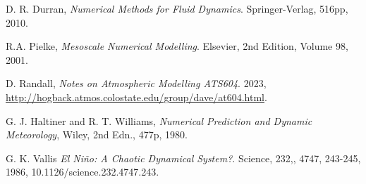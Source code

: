 D. R. Durran,
\emph{Numerical Methods for Fluid Dynamics}.
Springer-Verlag,
516pp,
2010.

R.A. Pielke,
\emph{Mesoscale Numerical Modelling}.
Elsevier,
2nd Edition, Volume 98,
2001.	

D. Randall,
\emph{Notes on Atmospheric Modelling ATS604}.
2023,
\url{http://hogback.atmos.colostate.edu/group/dave/at604.html}.

G. J. Haltiner and R. T. Williams,
\emph{Numerical Prediction and Dynamic Meteorology},
Wiley,
2nd Edn.,
477p,
1980.

G. K. Vallis 
\emph{El Ni\~{n}o: A Chaotic Dynamical System?}.
Science,
232,,
4747,
243-245, 
1986,
10.1126/science.232.4747.243.